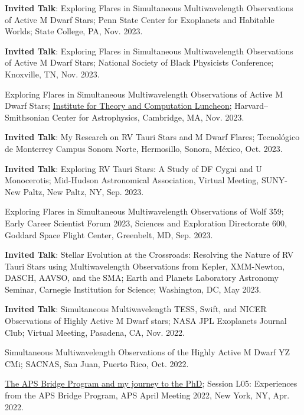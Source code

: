 \documentclass[12pt]{article}
\begin{document}
\begin{etaremune}
\item \textbf{Invited Talk}: Exploring Flares in Simultaneous Multiwavelength Observations of Active M Dwarf Stars; Penn State Center for Exoplanets and Habitable Worlds; State College, PA, Nov. 2023.

\item \textbf{Invited Talk}: Exploring Flares in Simultaneous Multiwavelength Observations of Active M Dwarf Stars; National Society of Black Physicists Conference; Knoxville, TN, Nov. 2023.

\item Exploring Flares in Simultaneous Multiwavelength Observations of Active M Dwarf Stars; \href{https://itc.cfa.harvard.edu/event/itc-luncheon-112}{Institute for Theory and Computation Luncheon}; Harvard--Smithsonian Center for Astrophysics, Cambridge, MA, Nov. 2023.

\item \textbf{Invited Talk}: My Research on RV Tauri Stars and M Dwarf Flares; Tecnol\'{o}gico de Monterrey Campus Sonora Norte, Hermosillo, Sonora, M\'{e}xico, Oct. 2023.

\item \textbf{Invited Talk}: Exploring RV Tauri Stars: A Study of DF Cygni and U Monocerotis; Mid-Hudson Astronomical Association, Virtual Meeting, SUNY-New Paltz, New Paltz, NY, Sep. 2023.

\item Exploring Flares in Simultaneous Multiwavelength Observations of Wolf 359; Early Career Scientist Forum 2023, Sciences and Exploration Directorate 600, Goddard Space Flight Center, Greenbelt, MD, Sep. 2023.

\item \textbf{Invited Talk}: Stellar Evolution at the Crossroads: Resolving the Nature of RV Tauri Stars using Multiwavelength Observations from Kepler, XMM-Newton, DASCH, AAVSO, and the SMA; Earth and Planets Laboratory Astronomy Seminar, Carnegie Institution for Science; Washington, DC, May 2023.

\item \textbf{Invited Talk}: Simultaneous Multiwavelength TESS, Swift, and NICER Observations of Highly Active M Dwarf stars; NASA JPL Exoplanets Journal Club; Virtual Meeting, Pasadena, CA, Nov. 2022.

\item Simultaneous Multiwavelength Observations of the Highly Active M Dwarf YZ CMi; SACNAS, San Juan, Puerto Rico, Oct. 2022.

\item \href{https://meetings.aps.org/Meeting/APR22/Session/L05.1}{The APS Bridge Program and my journey to the PhD}; Session L05: Experiences from the APS Bridge Program, APS April Meeting 2022, New York, NY, Apr. 2022.


\end{etaremune}
\end{document}
